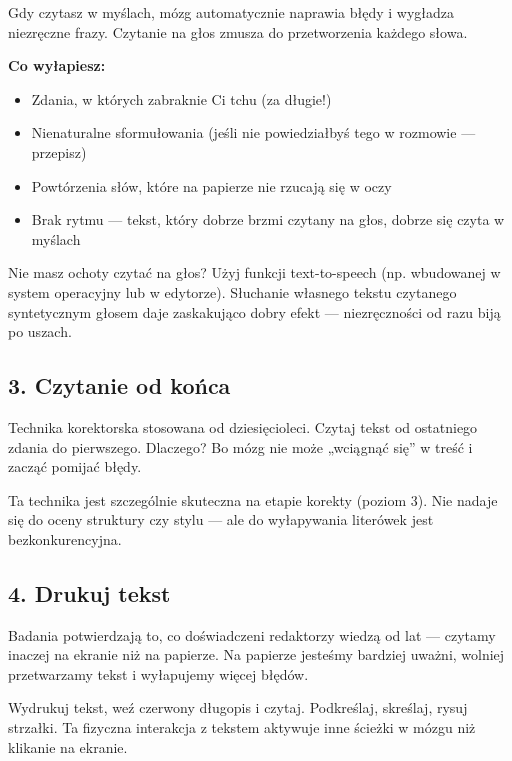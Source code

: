 \documentclass[
  12pt,
  a4paper,
  twoside,
  openright,
  12pt,
  DIV=12,
  BCOR=12mm]{scrbook}
\providecommand{\tightlist}{%
  \setlength{\itemsep}{0pt}\setlength{\parskip}{0pt}}\usepackage{longtable,booktabs,array}
\begin{document}
Gdy czytasz w myślach, mózg automatycznie naprawia błędy i wygładza
niezręczne frazy. Czytanie na głos zmusza do przetworzenia każdego
słowa.

\textbf{Co wyłapiesz:}

\begin{itemize}
\tightlist
\item
  Zdania, w których zabraknie Ci tchu (za długie!)
\item
  Nienaturalne sformułowania (jeśli nie powiedziałbyś tego w rozmowie
  --- przepisz)
\item
  Powtórzenia słów, które na papierze nie rzucają się w oczy
\item
  Brak rytmu --- tekst, który dobrze brzmi czytany na głos, dobrze się
  czyta w myślach
\end{itemize}

\begin{wskazowka}
Nie masz ochoty czytać na głos? Użyj funkcji text-to-speech (np. wbudowanej w system operacyjny lub w edytorze). Słuchanie własnego tekstu czytanego syntetycznym głosem daje zaskakująco dobry efekt --- niezręczności od razu biją po uszach.
\end{wskazowka}

\subsection{3. Czytanie od końca}\label{czytanie-od-koux144ca}

Technika korektorska stosowana od dziesięcioleci. Czytaj tekst od
ostatniego zdania do pierwszego. Dlaczego? Bo mózg nie może „wciągnąć
się'' w treść i zacząć pomijać błędy.

Ta technika jest szczególnie skuteczna na etapie korekty (poziom 3). Nie
nadaje się do oceny struktury czy stylu --- ale do wyłapywania literówek
jest bezkonkurencyjna.

\subsection{4. Drukuj tekst}\label{drukuj-tekst}

Badania potwierdzają to, co doświadczeni redaktorzy wiedzą od lat ---
czytamy inaczej na ekranie niż na papierze. Na papierze jesteśmy
bardziej uważni, wolniej przetwarzamy tekst i wyłapujemy więcej błędów.

Wydrukuj tekst, weź czerwony długopis i czytaj. Podkreślaj, skreślaj,
rysuj strzałki. Ta fizyczna interakcja z tekstem aktywuje inne ścieżki w
mózgu niż klikanie na ekranie.
\end{document}
